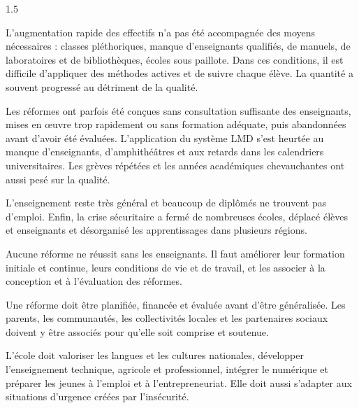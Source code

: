 \documentclass[12pt]{article}
\begin{document}
\begin{spacing}{1.5}

L'augmentation rapide des effectifs n'a pas été accompagnée des moyens nécessaires : classes pléthoriques, manque d'enseignants qualifiés, de manuels, de laboratoires et de bibliothèques, écoles sous paillote. Dans ces conditions, il est difficile d'appliquer des méthodes actives et de suivre chaque élève. La quantité a souvent progressé au détriment de la qualité.

Les réformes ont parfois été conçues sans consultation suffisante des enseignants, mises en œuvre trop rapidement ou sans formation adéquate, puis abandonnées avant d'avoir été évaluées. L'application du système LMD s'est heurtée au manque d'enseignants, d'amphithéâtres et aux retards dans les calendriers universitaires. Les grèves répétées et les années académiques chevauchantes ont aussi pesé sur la qualité.

L'enseignement reste très général et beaucoup de diplômés ne trouvent pas d'emploi. Enfin, la crise sécuritaire a fermé de nombreuses écoles, déplacé élèves et enseignants et désorganisé les apprentissages dans plusieurs régions.



Aucune réforme ne réussit sans les enseignants. Il faut améliorer leur formation initiale et continue, leurs conditions de vie et de travail, et les associer à la conception et à l'évaluation des réformes.

Une réforme doit être planifiée, financée et évaluée avant d'être généralisée. Les parents, les communautés, les collectivités locales et les partenaires sociaux doivent y être associés pour qu'elle soit comprise et soutenue.

L'école doit valoriser les langues et les cultures nationales, développer l'enseignement technique, agricole et professionnel, intégrer le numérique et préparer les jeunes à l'emploi et à l'entrepreneuriat. Elle doit aussi s'adapter aux situations d'urgence créées par l'insécurité.


\end{spacing}
\end{document}
